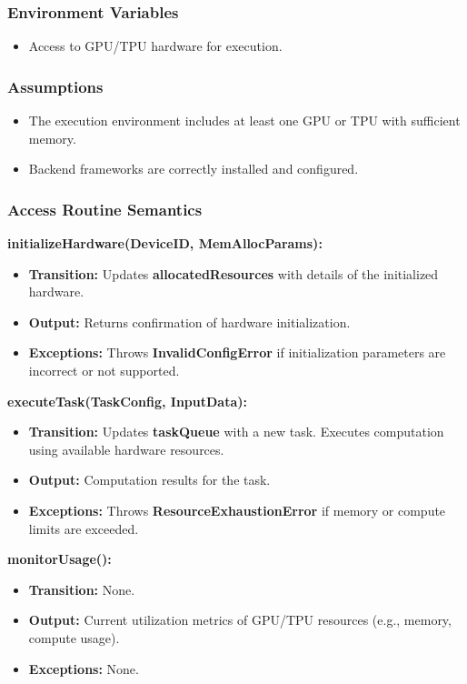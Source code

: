 \documentclass[12pt, titlepage]{article}
\begin{document}
\subsubsection{Environment Variables}
\begin{itemize}
    \item Access to GPU/TPU hardware for execution.
\end{itemize}

\subsubsection{Assumptions}
\begin{itemize}
    \item The execution environment includes at least one GPU or TPU with sufficient memory.
    \item Backend frameworks are correctly installed and configured.
\end{itemize}

\subsubsection{Access Routine Semantics}

\noindent \textbf{initializeHardware(DeviceID, MemAllocParams):}
\begin{itemize}
    \item \textbf{Transition:} Updates \textbf{allocatedResources} with details of the initialized hardware.
    \item \textbf{Output:} Returns confirmation of hardware initialization.
    \item \textbf{Exceptions:} Throws \textbf{InvalidConfigError} if initialization parameters are incorrect or not supported.
\end{itemize}

\noindent \textbf{executeTask(TaskConfig, InputData):}
\begin{itemize}
    \item \textbf{Transition:} Updates \textbf{taskQueue} with a new task. Executes computation using available hardware resources.
    \item \textbf{Output:} Computation results for the task.
    \item \textbf{Exceptions:} Throws \textbf{ResourceExhaustionError} if memory or compute limits are exceeded.
\end{itemize}

\noindent \textbf{monitorUsage():}
\begin{itemize}
    \item \textbf{Transition:} None.
    \item \textbf{Output:} Current utilization metrics of GPU/TPU resources (e.g., memory, compute usage).
    \item \textbf{Exceptions:} None.
\end{itemize}
\end{document}
